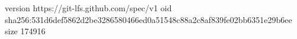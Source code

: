 version https://git-lfs.github.com/spec/v1
oid sha256:531d6def5862d2be3286580466ed0a51548c88a2c8af839fe02bb6351e29b6ee
size 174916
